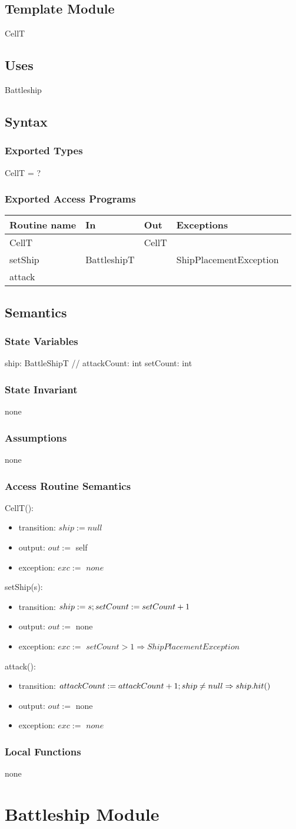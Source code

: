 \documentclass[12pt]{article}
\newcommand{\newTemplateModule}[9]{
	\subsection* {Template Module}
		#1
	\subsection* {Uses}
		#2
	\subsection* {Syntax}
		\subsubsection* {Exported Types}
			#3
		\subsubsection* {Exported Access Programs}
			#4
	\subsection* {Semantics}
		\subsubsection* {State Variables}
			#5
		\subsubsection* {State Invariant}
			#6
		\subsubsection* {Assumptions}
			#7
		\subsubsection* {Access Routine Semantics}
			#8
		\subsubsection* {Local Functions}
			#9
}
\newcommand{\newAccessProgram}[4]{
	\noindent #1:
		\begin{itemize}
			\item transition: #2
			\item output: $out :=$ #3
			\item exception: $exc :=$ #4
		\end{itemize}
}
\newcommand{\row}[4]{#1 & #2 & #3 & #4 ~\\ \hline}
\newcommand{\accessProgramsTableStart}{
\begin{tabular}{| l | l | l | l |}
\hline
\textbf{Routine name} & \textbf{In} & \textbf{Out} & \textbf{Exceptions}\\
\hline
}
\newcommand{\accessProgramsTableEnd}{
	\end{tabular}
}
\begin{document}
\newTemplateModule{CellT}
	{%
		Battleship
	}
	{%
		CellT = ?
	}
	{%
		\accessProgramsTableStart
			\row{CellT}{}{CellT}{}
			\row{setShip}{BattleshipT}{}{ShipPlacementException}
			\row{attack}{}{}{}
		\accessProgramsTableEnd
	}
	{%
		ship: BattleShipT //
		attackCount: int
		setCount: int
	}
	{%
		none
	}
	{%
		none
	}
	{%
		\newAccessProgram{CellT()}
			{%
				$ship := null$
			}
			{%
				self
			}
			{%
				$\mathit{none}$
			}
		\newAccessProgram{setShip(s)}
			{%
				$ship := s; \\
				setCount := setCount + 1$
			}
			{%
				none
			}
			{%
				$setCount > 1 \Rightarrow ShipPlacementException$
			}
		\newAccessProgram{attack()}
			{%
				$attackCount := attackCount + 1; \\
				ship \neq null \Rightarrow ship.hit()$}
			{%
				none
			}
			{%
				$\mathit{none}$
			}		
	}
	{%
		none
	}

\newpage

\section* {Battleship Module}

\label{Battleship}
\end{document}
